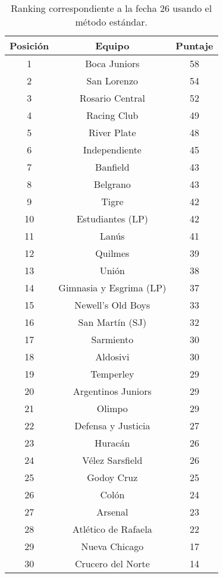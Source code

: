 \begin{table}
	\center
	\begin{tabular}{| c | c | c |}
	  	\hline
	  	Posición & Equipo & Puntaje \\ \hline \hline
		1 & Boca Juniors & 58 \\ \hline
		2 & San Lorenzo & 54 \\ \hline
		3 & Rosario Central & 52 \\ \hline
		4 & Racing Club & 49 \\ \hline
		5 & River Plate & 48 \\ \hline
		6 & Independiente & 45 \\ \hline
		7 & Banfield & 43 \\ \hline
		8 & Belgrano & 43 \\ \hline
		9 & Tigre & 42 \\ \hline
		10 & Estudiantes (LP) & 42 \\ \hline
		11 & Lanús & 41 \\ \hline
		12 & Quilmes & 39 \\ \hline
		13 & Unión & 38 \\ \hline
		14 & Gimnasia y Esgrima (LP) & 37 \\ \hline
		15 & Newell's Old Boys & 33 \\ \hline
		16 & San Martín (SJ) & 32 \\ \hline
		17 & Sarmiento & 30 \\ \hline
		18 & Aldosivi & 30 \\ \hline
		19 & Temperley & 29 \\ \hline
		20 & Argentinos Juniors & 29 \\ \hline
		21 & Olimpo & 29 \\ \hline
		22 & Defensa y Justicia & 27 \\ \hline
		23 & Huracán & 26 \\ \hline
		24 & Vélez Sarsfield & 26 \\ \hline
		25 & Godoy Cruz & 25 \\ \hline
		26 & Colón & 24 \\ \hline
		27 & Arsenal & 23 \\ \hline
		28 & Atlético de Rafaela & 22 \\ \hline
		29 & Nueva Chicago & 17 \\ \hline
		30 & Crucero del Norte & 14 \\ \hline
	\end{tabular}
	\caption{\footnotesize Ranking correspondiente a la fecha 26 usando el método estándar.}
\end{table}

